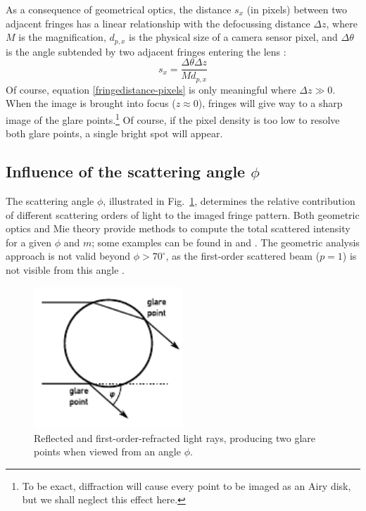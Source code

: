 \documentclass[11.5pt,oneside]{book}
\newcommand*{\figref}[1]{Fig.~\ref{#1}}
\begin{document}
As a consequence of geometrical optics, the distance $s_x$ (in pixels) between two
adjacent fringes has a linear relationship with the defocussing distance $\Delta
z$, where $M$ is the magnification, $d_{p,x}$ is the physical size of a
camera sensor pixel, and $\Delta \theta$ is the angle subtended by two adjacent
fringes entering the lens \cite{Pan06}:
\begin{equation}
  s_x = \frac{\Delta \theta \Delta z}{M d_{p,x}} 
  \label{fringedistance-pixels}
\end{equation}
Of course, equation \eqref{fringedistance-pixels} is only meaningful where $\Delta z \gg
0$. When the image is brought into focus ($z\approx 0$), fringes will give way to a sharp
image of the glare points.\footnote{To be exact, diffraction will
cause every point to be imaged as an Airy disk, but we shall neglect
this effect here.} Of course, if the pixel density is too low to resolve
both glare points, a single bright spot will appear. 

\subsection{Influence of the scattering angle $\phi$}
The scattering angle $\phi$, illustrated in \figref{fig:droplet-rays}, determines the
relative contribution of different scattering orders of light to the imaged
fringe pattern. Both geometric optics \cite{Vandehulst12} and Mie theory provide
methods to compute the total scattered intensity for a given $\phi$ and $m$;
some examples can be found in \citet{Kawaguchi02} and \citet{Mounaim99}. The
geometric analysis approach is not valid beyond $\phi > 70^\circ$, as the
first-order scattered beam ($p=1$) is not visible from this angle
\cite{Glover95}.

\begin{figure}
\centering
\includegraphics[width=0.5\textwidth]{img/setup/droplet_rays.pdf}
\caption{Reflected and first-order-refracted light rays, producing two glare
points when viewed from an angle $\phi$. \label{fig:droplet-rays}}
\end{figure}
\end{document}
